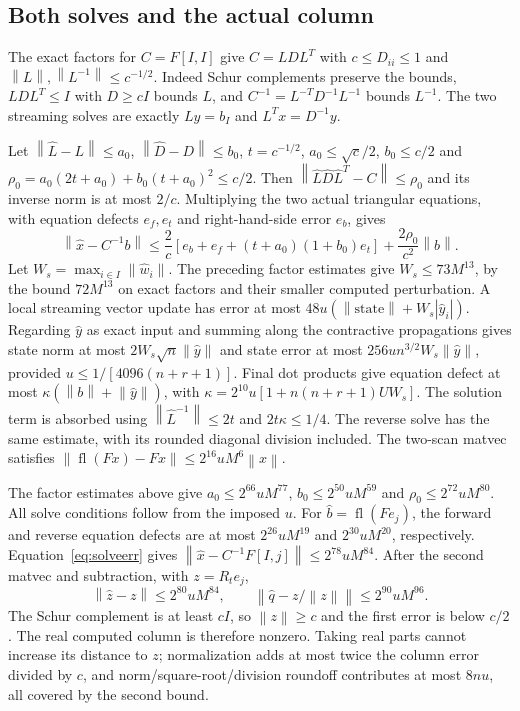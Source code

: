 \documentclass[11pt]{article}
\theoremstyle{remark}\newtheorem{remark}[theorem]{Remark}
\newcommand{\norm}[1]{\left\lVert#1\right\rVert}
\newcommand{\abs}[1]{\left\lvert#1\right\rvert}
\newcommand{\fl}{\operatorname{fl}}
\begin{document}
\subsection{Both solves and the actual column}
The exact factors for $C=F[I,I]$ give $C=LDL^T$ with
$c\le D_{ii}\le1$ and $\norm L,\norm{L^{-1}}\le c^{-1/2}$.
Indeed Schur complements preserve the bounds, $LDL^T\le I$ with $D\ge cI$
bounds $L$, and $C^{-1}=L^{-T}D^{-1}L^{-1}$ bounds $L^{-1}$.
The two streaming solves are exactly $Ly=b_I$ and $L^Tx=D^{-1}y$.

Let $\norm{\widehat L-L}\le a_0$, $\norm{\widehat D-D}\le b_0$,
$t=c^{-1/2}$, $a_0\le\sqrt c/2$, $b_0\le c/2$ and
$\rho_0=a_0(2t+a_0)+b_0(t+a_0)^2\le c/2$.
Then $\norm{\widehat L\widehat D\widehat L^T-C}\le\rho_0$ and its
inverse norm is at most $2/c$. Multiplying the two actual triangular
equations, with equation defects $e_f,e_t$ and right-hand-side error $e_b$,
gives
\begin{equation}\label{eq:solveerr}
 \norm{\widehat x-C^{-1}b}\le\frac2c
 [e_b+e_f+(t+a_0)(1+b_0)e_t]+\frac{2\rho_0}{c^2}\norm b.
\end{equation}
Let $W_s=\max_{i\in I}\norm{\widehat w_i}$. The preceding
factor estimates give $W_s\le73M^{13}$, by the bound $72M^{13}$
on exact factors and their smaller computed perturbation.
A local streaming vector update has error at most
$48u(\norm{\mathrm{state}}+W_s\abs{\widehat y_i})$.
Regarding $\widehat y$ as exact input and summing along the contractive
propagations gives state norm at most $2W_s\sqrt n\norm{\widehat y}$ and
state error at most $256un^{3/2}W_s\norm{\widehat y}$, provided
$u\le1/[4096(n+r+1)]$. Final dot products give equation defect at most
$\kappa(\norm b+\norm{\widehat y})$, with
$\kappa=2^{10}u[1+n(n+r+1)UW_s]$. The solution term is absorbed using
$\norm{\widehat L^{-1}}\le2t$ and $2t\kappa\le1/4$.
The reverse solve has the same estimate, with its rounded diagonal division
included. The two-scan matvec satisfies
$\norm{\fl(Fx)-Fx}\le2^{16}uM^6\norm x$.

The factor estimates above give
$a_0\le2^{66}uM^{77}$, $b_0\le2^{50}uM^{59}$ and
$\rho_0\le2^{72}uM^{80}$. All solve conditions follow from the imposed $u$.
For $\widehat b=\fl(Fe_j)$, the forward and reverse equation defects are at
most $2^{26}uM^{19}$ and $2^{30}uM^{20}$, respectively.
Equation~\eqref{eq:solveerr} gives
$\norm{\widehat x-C^{-1}F[I,j]}\le2^{78}uM^{84}$.
After the second matvec and subtraction, with $z=R_te_j$,
\begin{equation}\label{eq:columnerr}
 \norm{\widehat z-z}\le2^{80}uM^{84},\qquad
 \norm{\widehat q-z/\norm z}\le2^{90}uM^{96}.
\end{equation}
The Schur complement is at least $cI$, so $\norm z\ge c$ and the first
error is below $c/2$. The real computed column is therefore nonzero.
Taking real parts cannot increase its distance to $z$; normalization adds
at most twice the column error divided by $c$, and norm/square-root/division
roundoff contributes at most $8nu$, all covered by the second bound.
\end{document}
